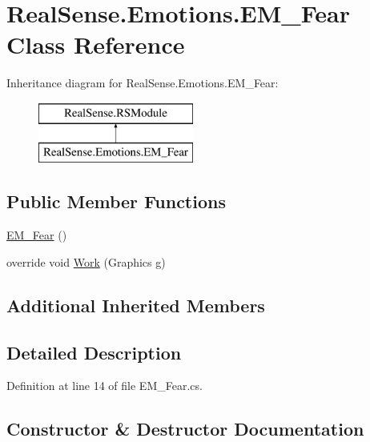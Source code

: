 \hypertarget{class_real_sense_1_1_emotions_1_1_e_m___fear}{}\section{Real\+Sense.\+Emotions.\+E\+M\+\_\+\+Fear Class Reference}
\label{class_real_sense_1_1_emotions_1_1_e_m___fear}
Inheritance diagram for Real\+Sense.\+Emotions.\+E\+M\+\_\+\+Fear\+:\begin{figure}[H]
\begin{center}
\leavevmode
\includegraphics[height=2.000000cm]{class_real_sense_1_1_emotions_1_1_e_m___fear}
\end{center}
\end{figure}
\subsection*{Public Member Functions}
\begin{DoxyCompactItemize}
\item 
\hyperlink{class_real_sense_1_1_emotions_1_1_e_m___fear_af5fb3d9f1043968e5b673c5cfc478f97}{E\+M\+\_\+\+Fear} ()
\item 
override void \hyperlink{class_real_sense_1_1_emotions_1_1_e_m___fear_a5b417a4a8403f101585dc8c239288c54}{Work} (Graphics g)
\end{DoxyCompactItemize}
\subsection*{Additional Inherited Members}


\subsection{Detailed Description}


Definition at line 14 of file E\+M\+\_\+\+Fear.\+cs.



\subsection{Constructor \& Destructor Documentation}
\mbox{\label{class_real_sense_1_1_emotions_1_1_e_m___fear_af5fb3d9f1043968e5b673c5cfc478f97}} 
